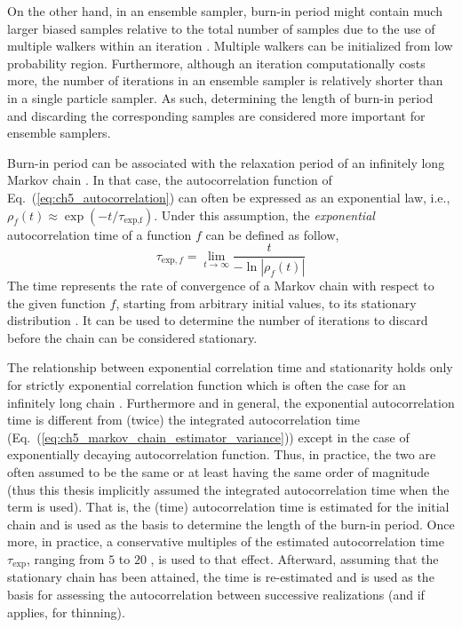 On the other hand, in an ensemble sampler, burn-in period might contain much larger biased samples relative to the total number of samples due to the use of multiple walkers within an iteration \cite{Hou2012,Foreman-Mackey2013,Akeret2013}.
Multiple walkers can be initialized from low probability region. 
Furthermore, although an iteration computationally costs more, the number of iterations in an ensemble sampler is relatively shorter than in a single particle sampler.
As such, determining the length of burn-in period and discarding the corresponding samples are considered more important for ensemble samplers.

Burn-in period can be associated with the relaxation period of an infinitely long Markov chain \cite{Sokal1997}.
In that case, the autocorrelation function of Eq.~(\ref{eq:ch5_autocorrelation}) can often be expressed as an exponential law, i.e., $\rho_f(t) \approx \exp{(-t/\tau_\text{exp,f})}$. 
Under this assumption, the \emph{exponential} autocorrelation time of a function $f$ can be defined as follow,
\begin{equation}
  \tau_{\text{exp},f} = \lim\limits_{t\rightarrow\infty} \frac{t}{-\ln{|\rho_f(t)|}} 
\label{eq:ch5_markov_chain_exponential_autocorrelation_time}
\end{equation}
The time represents the rate of convergence of a Markov chain with respect to the given function $f$, starting from arbitrary initial values, to its stationary distribution \cite{Sokal1997}.
It can be used to determine the number of iterations to discard before the chain can be considered stationary.

The relationship between exponential correlation time and stationarity holds only for strictly exponential correlation function which is often the case for an infinitely long chain \cite{Sokal1997}.
Furthermore and in general, the exponential autocorrelation time is different from (twice) the integrated autocorrelation time (Eq.~(\ref{eq:ch5_markov_chain_estimator_variance})) except in the case of exponentially decaying autocorrelation function.
Thus, in practice, the two are often assumed to be the same \cite{Foreman-Mackey2013,Akeret2013} or at least having the same order of magnitude \cite{Sokal1997} (thus this thesis implicitly assumed the integrated autocorrelation time when the term is used).
That is, the (time) autocorrelation time is estimated for the initial chain and is used as the basis to determine the length of the burn-in period. 
Once more, in practice, a conservative multiples of the estimated autocorrelation time $\tau_\text{exp}$, ranging from $5$ \cite{Foreman-Mackey2013} to $20$ \cite{Sokal1997}, is used to that effect.
Afterward, assuming that the stationary chain has been attained, the time is re-estimated and is used as the basis for assessing the autocorrelation between successive realizations (and if applies, for thinning).


